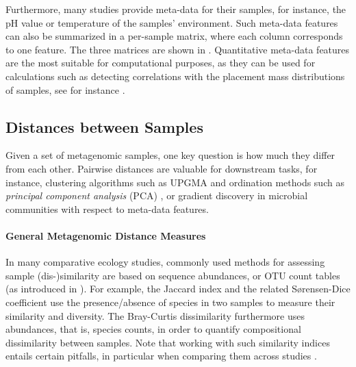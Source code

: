 Furthermore, many studies provide meta-data for their samples,
for instance, the pH value or temperature of the samples' environment.
Such meta-data features can also be summarized in a per-sample matrix, where each column corresponds to one feature.
The three matrices are shown in .
Quantitative meta-data features are the most suitable for computational purposes,
as they can be used for calculations such as detecting correlations with the placement mass distributions of samples,
see for instance .


\subsection{Distances between Samples}
\label{ch:Foundations:sec:PhylogeneticPlacement:sub:Distances}

Given a set of metagenomic samples, one key question is how much they differ from each other.
Pairwise distances are valuable for downstream tasks, for instance,
clustering algorithms such as \mbox{UPGMA} \cite{Michener1957,Sokal1958,Legendre1998} and
ordination methods such as \emph{principal component analysis} (PCA) \cite{Pearson1901,Jolliffe2002},
or gradient discovery in microbial communities with respect to meta-data features.

\paragraph{General Metagenomic Distance Measures}
\label{ch:Foundations:sec:PhylogeneticPlacement:sub:Distances:par:GeneralMeasures}

In many comparative ecology studies, commonly used methods for assessing sample (dis-)similarity are based on
sequence abundances, or OTU count tables
(as introduced in ).
For example, the Jaccard index \cite{Jaccard1901} and the related S\o{}rensen-Dice coefficient \cite{Sorensen1948,Dice1945}
use the presence/absence of species in two samples to measure their similarity and diversity.
The Bray-Curtis dissimilarity \cite{Bray1957,Legendre1998} furthermore uses abundances,
that is, species counts, in order to quantify compositional dissimilarity between samples.
Note that working with such similarity indices entails certain pitfalls,
in particular when comparing them across studies \cite{Bloom1981}.

